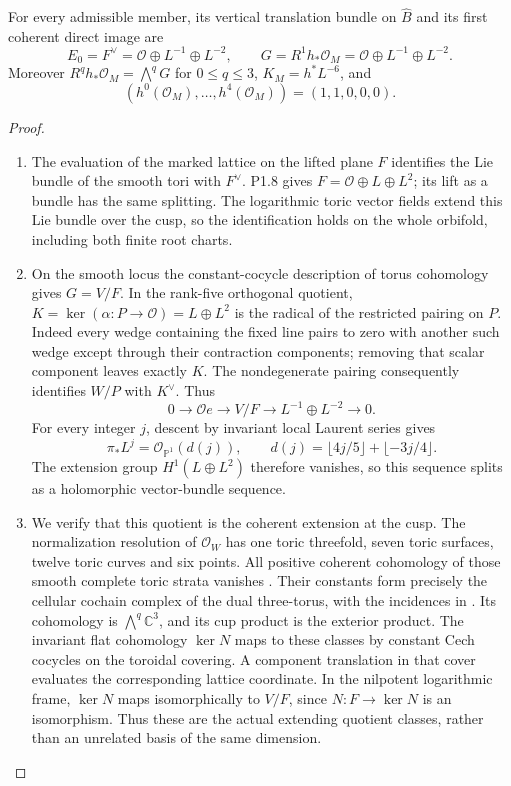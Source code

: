 \begin{theorem}\label{night:P1A.1}
For every admissible member, its vertical translation bundle on
$\widehat B$ and its first coherent direct image are
\[
 E_0=F^\vee=\mathcal O\oplus L^{-1}\oplus L^{-2},\qquad
 G=R^1h_*\mathcal O_M=\mathcal O\oplus L^{-1}\oplus L^{-2}.
\]
Moreover $R^qh_*\mathcal O_M=\bigwedge^qG$ for $0\le q\le3$,
$K_M=h^*L^{-6}$, and
\[
 (h^0(\mathcal O_M),\ldots,h^4(\mathcal O_M))=(1,1,0,0,0).
\]
\end{theorem}
\begin{proof}
\begin{enumerate}[label=\arabic*.]
\item The evaluation of the marked lattice on the lifted plane $F$
identifies the Lie bundle of the smooth tori with $F^\vee$.
P1.8 gives $F=\mathcal O\oplus L\oplus L^2$; its lift as a bundle
has the same splitting. The logarithmic toric vector fields extend
this Lie bundle over the cusp, so the identification holds on the
whole orbifold, including both finite root charts.

\item On the smooth locus the constant-cocycle description of torus
cohomology gives $G=V/F$. In the rank-five orthogonal quotient,
$K=\ker(\alpha:P\to\mathcal O)=L\oplus L^2$ is the radical of
the restricted pairing on $P$. Indeed every wedge containing the
fixed line pairs to zero with another such wedge except through
their contraction components; removing that scalar component
leaves exactly $K$. The nondegenerate pairing consequently
identifies $W/P$ with $K^\vee$. Thus
\[
 0\longrightarrow\mathcal O e\longrightarrow V/F
   \longrightarrow L^{-1}\oplus L^{-2}\longrightarrow0.
\]
For every integer $j$, descent by invariant local Laurent series gives
\begin{equation}\label{eq:P1Adegree}
 \pi_*L^j=\mathcal O_{\mathbb P^1}(d(j)),\qquad
 d(j)=\lfloor4j/5\rfloor+\lfloor-3j/4\rfloor.
\end{equation}
The extension group $H^1(L\oplus L^2)$ therefore vanishes, so this
sequence splits as a holomorphic vector-bundle sequence.

\item We verify that this quotient is the coherent extension at the cusp.
The normalization resolution of $\mathcal O_W$ has one toric
threefold, seven toric surfaces, twelve toric curves and six points.
All positive coherent cohomology of those smooth complete toric
strata vanishes \cite[Theorem 9.2.3, p.~410]{CoxLittleSchenck2011}. Their constants form precisely the cellular
cochain complex of the dual three-torus, with the incidences in
. Its cohomology is
$\bigwedge^q\mathbb C^3$, and its cup product is the exterior product.
The invariant flat cohomology $\ker N$ maps to these classes by
constant Cech cocycles on the toroidal covering. A component
translation in that cover evaluates the corresponding lattice
coordinate. In the nilpotent logarithmic frame, $\ker N$ maps
isomorphically to $V/F$, since $N:F\to\ker N$ is an isomorphism.
Thus these are the actual extending quotient classes, rather than
an unrelated basis of the same dimension.


\end{enumerate}
\end{proof}
